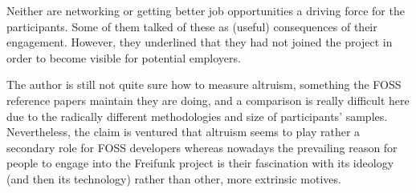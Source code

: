 Neither are networking or getting better job opportunities a driving force for the participants.
Some of them talked of these as (useful) consequences of their engagement.
However, they underlined that they had not joined the project in order to become visible for potential employers.





The author is still not quite sure how to measure altruism, something the FOSS reference papers maintain they are doing, and a comparison is really difficult here due to the radically different methodologies and size of participants' samples.
Nevertheless, the claim is ventured that altruism seems to play rather a secondary role for FOSS developers whereas nowadays the prevailing reason for people to engage into the Freifunk project is their fascination with its ideology (and then its technology) rather than other, more extrinsic motives.


\begin{comment}
# Was ist am Projekt nicht so cool?

### Kommunikations/Diskussionskultur

* "Kommunikationskultur"
* "Arbeit im Team ist manchmal schwierig"
* "wenn Leute meinen, den richtigen Weg gefunden zu haben und den anderen aufzuzwingen und alles an sich reißen"
* "wenn sich Menschen richtig bekämpfen, hat das das Potenzial auch das Gesamtprojekt richtig runter zu ziehen"
* "treffen, die man viel redet und nichts passiert sind auch lästig"
* "leute, die in die presse sich als organisator_innen ausgeben und nur auf dem ruhm aus sind; trotzdem ist auch wichtig, dass jemand mit der presse und mit der stadt redet"

---

### Gender

* "genderthemen: community besteht größtenteils aus männern, die zu öffnen/erweiter funktioniert bis jetzt nicht so gut"

---
\end{comment}
